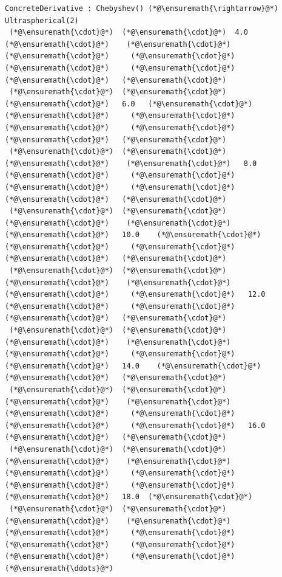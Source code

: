 \documentclass[12pt,a4paper]{article}
\begin{document}
\begin{lstlisting}
ConcreteDerivative : Chebyshev() (*@\ensuremath{\rightarrow}@*) Ultraspherical(2)
 (*@\ensuremath{\cdot}@*)  (*@\ensuremath{\cdot}@*)  4.0   (*@\ensuremath{\cdot}@*)    (*@\ensuremath{\cdot}@*)     (*@\ensuremath{\cdot}@*)     (*@\ensuremath{\cdot}@*)     (*@\ensuremath{\cdot}@*)     (*@\ensuremath{\cdot}@*)     (*@\ensuremath{\cdot}@*)   (*@\ensuremath{\cdot}@*)
 (*@\ensuremath{\cdot}@*)  (*@\ensuremath{\cdot}@*)   (*@\ensuremath{\cdot}@*)   6.0   (*@\ensuremath{\cdot}@*)     (*@\ensuremath{\cdot}@*)     (*@\ensuremath{\cdot}@*)     (*@\ensuremath{\cdot}@*)     (*@\ensuremath{\cdot}@*)     (*@\ensuremath{\cdot}@*)   (*@\ensuremath{\cdot}@*)
 (*@\ensuremath{\cdot}@*)  (*@\ensuremath{\cdot}@*)   (*@\ensuremath{\cdot}@*)    (*@\ensuremath{\cdot}@*)   8.0    (*@\ensuremath{\cdot}@*)     (*@\ensuremath{\cdot}@*)     (*@\ensuremath{\cdot}@*)     (*@\ensuremath{\cdot}@*)     (*@\ensuremath{\cdot}@*)   (*@\ensuremath{\cdot}@*)
 (*@\ensuremath{\cdot}@*)  (*@\ensuremath{\cdot}@*)   (*@\ensuremath{\cdot}@*)    (*@\ensuremath{\cdot}@*)    (*@\ensuremath{\cdot}@*)   10.0    (*@\ensuremath{\cdot}@*)     (*@\ensuremath{\cdot}@*)     (*@\ensuremath{\cdot}@*)     (*@\ensuremath{\cdot}@*)   (*@\ensuremath{\cdot}@*)
 (*@\ensuremath{\cdot}@*)  (*@\ensuremath{\cdot}@*)   (*@\ensuremath{\cdot}@*)    (*@\ensuremath{\cdot}@*)    (*@\ensuremath{\cdot}@*)     (*@\ensuremath{\cdot}@*)   12.0    (*@\ensuremath{\cdot}@*)     (*@\ensuremath{\cdot}@*)     (*@\ensuremath{\cdot}@*)   (*@\ensuremath{\cdot}@*)
 (*@\ensuremath{\cdot}@*)  (*@\ensuremath{\cdot}@*)   (*@\ensuremath{\cdot}@*)    (*@\ensuremath{\cdot}@*)    (*@\ensuremath{\cdot}@*)     (*@\ensuremath{\cdot}@*)     (*@\ensuremath{\cdot}@*)   14.0    (*@\ensuremath{\cdot}@*)     (*@\ensuremath{\cdot}@*)   (*@\ensuremath{\cdot}@*)
 (*@\ensuremath{\cdot}@*)  (*@\ensuremath{\cdot}@*)   (*@\ensuremath{\cdot}@*)    (*@\ensuremath{\cdot}@*)    (*@\ensuremath{\cdot}@*)     (*@\ensuremath{\cdot}@*)     (*@\ensuremath{\cdot}@*)     (*@\ensuremath{\cdot}@*)   16.0    (*@\ensuremath{\cdot}@*)   (*@\ensuremath{\cdot}@*)
 (*@\ensuremath{\cdot}@*)  (*@\ensuremath{\cdot}@*)   (*@\ensuremath{\cdot}@*)    (*@\ensuremath{\cdot}@*)    (*@\ensuremath{\cdot}@*)     (*@\ensuremath{\cdot}@*)     (*@\ensuremath{\cdot}@*)     (*@\ensuremath{\cdot}@*)     (*@\ensuremath{\cdot}@*)   18.0  (*@\ensuremath{\cdot}@*)
 (*@\ensuremath{\cdot}@*)  (*@\ensuremath{\cdot}@*)   (*@\ensuremath{\cdot}@*)    (*@\ensuremath{\cdot}@*)    (*@\ensuremath{\cdot}@*)     (*@\ensuremath{\cdot}@*)     (*@\ensuremath{\cdot}@*)     (*@\ensuremath{\cdot}@*)     (*@\ensuremath{\cdot}@*)     (*@\ensuremath{\cdot}@*)   (*@\ensuremath{\ddots}@*)

\end{lstlisting}
\end{document}
